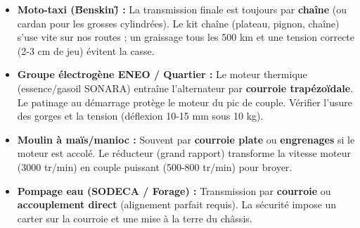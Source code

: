 \documentclass[11pt]{article}
\begin{document}
\begin{savaistu}
\begin{itemize}
\item \textbf{Moto-taxi (\"Benskin\") :} La transmission finale est toujours par \textbf{chaîne} (ou cardan pour les grosses cylindrées). Le kit chaîne (plateau, pignon, chaîne) s'use vite sur nos routes ; un graissage tous les 500 km et une tension correcte (2-3 cm de jeu) évitent la casse.
\item \textbf{Groupe électrogène ENEO / Quartier :} Le moteur thermique (essence/gasoil SONARA) entraîne l'alternateur par \textbf{courroie trapézoïdale}. Le patinage au démarrage protège le moteur du pic de couple. Vérifier l'usure des gorges et la tension (déflexion 10-15 mm sous 10 kg).
\item \textbf{Moulin à maïs/manioc :} Souvent par \textbf{courroie plate} ou \textbf{engrenages} si le moteur est accolé. Le réducteur (grand rapport) transforme la vitesse moteur (3000 tr/min) en couple puissant (500-800 tr/min) pour broyer.
\item \textbf{Pompage eau (SODECA / Forage) :} Transmission par \textbf{courroie} ou \textbf{accouplement direct} (alignement parfait requis). La sécurité impose un carter sur la courroie et une mise à la terre du châssis.
\end{itemize}
\end{savaistu}
\end{document}
